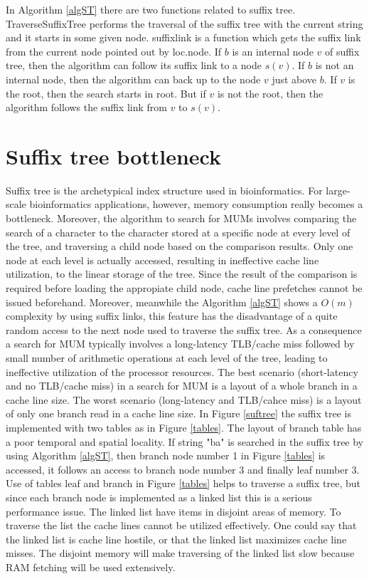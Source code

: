 \documentclass[conference]{IEEEtran}
\begin{document}
In Algorithm \ref{algST} there are two functions related to suffix tree. TraverseSuffixTree performs the traversal of the suffix tree with the current string  and it starts in some given node. suffixlink is a function which gets the suffix link from the current node pointed out by loc.node. If $b$ is an internal node $v$ of suffix tree, then the algorithm can follow its suffix link to a node $s(v)$. If $b$ is not an internal node, then the algorithm can back up to the node $v$ just above $b$. If $v$ is the root, then the search starts in root. But if $v$ is not the root, then the algorithm follows the suffix link from $v$ to $s(v)$.
\section{Suffix tree bottleneck}
Suffix tree is the archetypical index structure used in bioinformatics. For large-scale bioinformatics applications, however, memory consumption really becomes a bottleneck. Moreover, the algorithm to search for MUMs involves comparing the search of a character to the character stored at a specific node at every level of the tree, and traversing a child node based on the comparison results. Only one node at each level is actually accessed, resulting in ineffective cache line utilization, to the linear storage of the tree. Since the result of the comparison is required before loading the appropiate child node, cache line prefetches cannot be issued beforehand. Moreover, meanwhile the Algorithm \ref{algST} shows a $O(m)$ complexity by using suffix links, this feature has the disadvantage of a quite random access to the next node used to traverse the suffix tree. As a consequence a search for MUM typically involves a long-latency TLB/cache miss followed by small number of arithmetic operations at each level of the tree, leading to ineffective utilization of the processor resources.
The best scenario (short-latency and no TLB/cache miss) in a search for MUM is a layout of a whole branch in a cache line size. The worst scenario (long-latency and TLB/cahce miss) is a layout of only one branch read in a cache line size. In Figure \ref{suftree} the suffix tree is implemented with two tables as in Figure \ref{tables}. The layout of branch table has a poor temporal and spatial locality. If string "ba" is searched in the suffix tree by using Algorithm \ref{algST}, then branch node number 1 in Figure \ref{tables} is accessed, it follows an access to branch node number 3 and finally leaf number 3. Use of tables leaf and branch in Figure \ref{tables} helps to traverse a suffix tree, but since each branch node is implemented as a linked list this is a serious performance issue. The linked list have items in disjoint areas of memory. To traverse the list the cache lines cannot be utilized effectively. One could say that the linked list is cache line hostile, or that the linked list maximizes cache line misses. The disjoint memory will make traversing of the linked list slow because RAM fetching will be used extensively.
\end{document}
